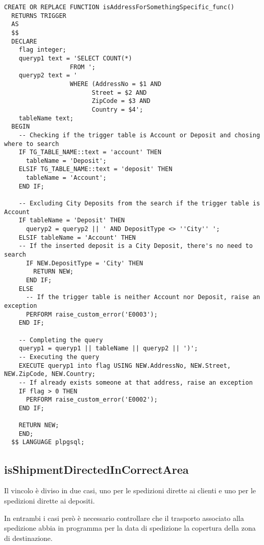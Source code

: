 \newpage
\begin{lstlisting}[caption={Creazione della funzione \textbf{isAddressForSomethingSpecific\_func}}, label={isAddressForSomethingSpecific}]
  CREATE OR REPLACE FUNCTION isAddressForSomethingSpecific_func()
  RETURNS TRIGGER
  AS 
  $$
  DECLARE 
    flag integer;
    queryp1 text = 'SELECT COUNT(*) 
                  FROM ';
    queryp2 text = ' 
                  WHERE (AddressNo = $1 AND 
                        Street = $2 AND 
                        ZipCode = $3 AND  
                        Country = $4';
    tableName text;
  BEGIN
    -- Checking if the trigger table is Account or Deposit and chosing where to search
    IF TG_TABLE_NAME::text = 'account' THEN
      tableName = 'Deposit';
    ELSIF TG_TABLE_NAME::text = 'deposit' THEN
      tableName = 'Account';
    END IF; 

    -- Excluding City Deposits from the search if the trigger table is Account
    IF tableName = 'Deposit' THEN
      queryp2 = queryp2 || ' AND DepositType <> ''City'' ';
    ELSIF tableName = 'Account' THEN
    -- If the inserted deposit is a City Deposit, there's no need to search
      IF NEW.DepositType = 'City' THEN
        RETURN NEW;
      END IF;
    ELSE 
      -- If the trigger table is neither Account nor Deposit, raise an exception
      PERFORM raise_custom_error('E0003');
    END IF;
        
    -- Completing the query
    queryp1 = queryp1 || tableName || queryp2 || ')';
    -- Executing the query
    EXECUTE queryp1 into flag USING NEW.AddressNo, NEW.Street, NEW.ZipCode, NEW.Country;
    -- If already exists someone at that address, raise an exception
    IF flag > 0 THEN
      PERFORM raise_custom_error('E0002');
    END IF;

    RETURN NEW;
    END;
  $$ LANGUAGE plpgsql;
\end{lstlisting}

\newpage

\subsection{\textbf{isShipmentDirectedInCorrectArea}}

Il vincolo è diviso in due casi, uno per le spedizioni dirette ai clienti e uno per le spedizioni dirette ai depositi.

In entrambi i casi però è necessario controllare che il trasporto associato alla spedizione abbia in programma per la data di spedizione la copertura della zona di destinazione.

